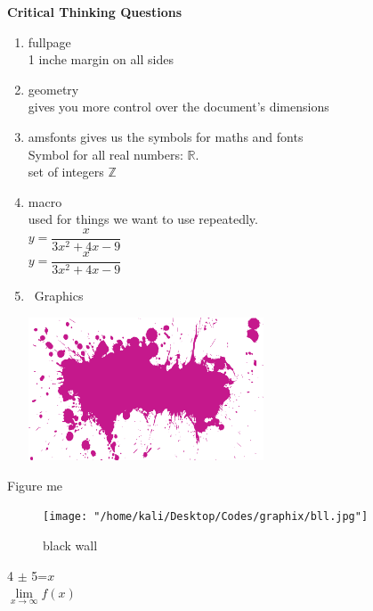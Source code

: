 \documentclass[14pt,a4paper]{article}
\def\equa1{y=\dfrac{x}{3x^2+4x-9}}
\newcommand{\set}[1]{\setlength\itemsep{#1em}}
\begin{document}
	\textbf{Critical Thinking Questions}

	\begin{enumerate}
		\set{3} %

		\item{fullpage}\\
		1 inche margin on all sides
		\item{geometry}\\
		gives you more control over the document's dimensions

		\item{amsfonts gives us the symbols for maths and fonts}\\
		Symbol for all real numbers: $\mathbb{R}$.\\
		set of integers $\mathbb{Z}$

		\item {macro }\\
		used for things we want to use repeatedly.\\
		$\equa1$ \\
		$\equa1$ \\

		\item\ Graphics\\
		\begin{center}
		\includegraphics[scale=0.5,width=7cm]{s}
			\end{center}
	\end{enumerate}
	Figure me \\
	\begin{figure}[H]
		\centering
		\texttt{[image: "/home/kali/Desktop/Codes/graphix/bll.jpg"]}
		\caption{black wall}
	\end{figure}
	4 $\pm$ 5=$x$
	\\
	\centering
	$\lim\limits_{x \to \infty}f(x)$
\end{document}
